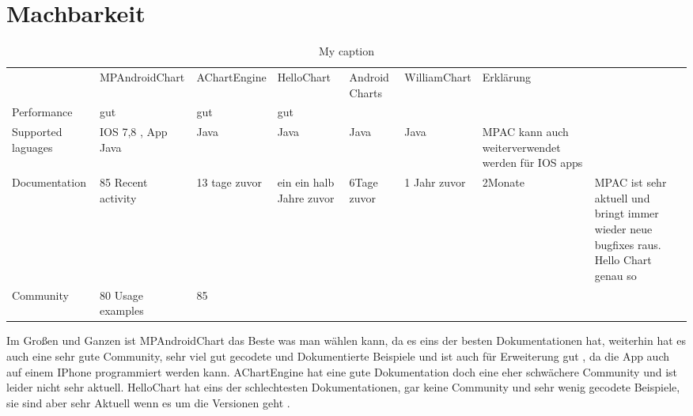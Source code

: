 \chapter{Machbarkeit }
\begin{table}[]
\centering
\caption{My caption}
\label{my-label}
\begin{tabular}{lllll}
 & MPAndroidChart & AChartEngine & HelloChart & Android Charts& WilliamChart & Erklärung \\
Performance & gut & gut & gut &  \\
Supported laguages & IOS 7,8 , App Java & Java & Java & Java & Java & MPAC kann auch weiterverwendet werden für IOS apps \\
Documentation & 85%
Recent activity & 13 tage zuvor & ein ein halb Jahre zuvor & 6Tage zuvor & 1 Jahr zuvor & 2Monate & MPAC ist sehr aktuell und bringt immer wieder neue bugfixes raus. Hello Chart genau so \\
Community & 80%
Usage examples & 85%
\end{tabular}
\end{table}

Im Großen und Ganzen ist MPAndroidChart das Beste was man wählen kann, da es eins der besten Dokumentationen hat, weiterhin hat es auch eine sehr gute Community, sehr viel gut gecodete und Dokumentierte Beispiele und ist auch für Erweiterung gut , da die App auch auf einem IPhone programmiert werden kann. 
AChartEngine hat eine gute Dokumentation doch eine eher schwächere Community und ist leider nicht sehr aktuell. 
HelloChart hat eins der schlechtesten Dokumentationen, gar keine Community und sehr wenig gecodete Beispiele, sie sind aber sehr Aktuell wenn es um die Versionen geht .
 